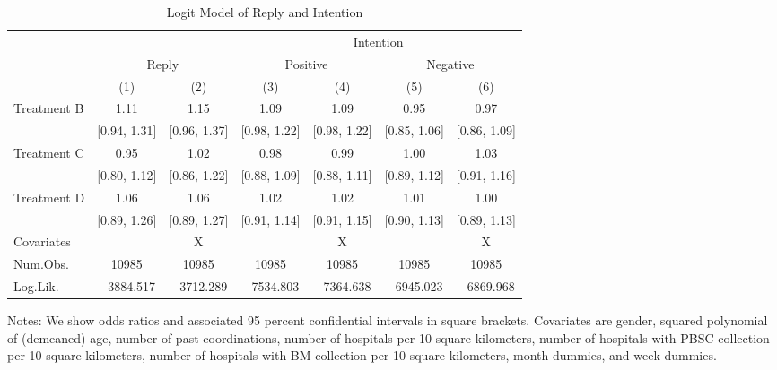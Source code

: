 \documentclass[
]{article}
\begin{document}
\begin{table}[H]

\caption{\label{tab:logit-stock}Logit Model of Reply and Intention}
\centering
\fontsize{9}{11}\selectfont
\begin{threeparttable}
\begin{tabular}[t]{lcccccc}
\toprule
\multicolumn{3}{c}{ } & \multicolumn{4}{c}{Intention} \\
\cmidrule(l{3pt}r{3pt}){4-7}
\multicolumn{1}{c}{ } & \multicolumn{2}{c}{Reply} & \multicolumn{2}{c}{Positive} & \multicolumn{2}{c}{Negative} \\
\cmidrule(l{3pt}r{3pt}){2-3} \cmidrule(l{3pt}r{3pt}){4-5} \cmidrule(l{3pt}r{3pt}){6-7}
  & (1) & (2) & (3) & (4) & (5) & (6)\\
\midrule
Treatment B & \num{1.11} & \num{1.15} & \num{1.09} & \num{1.09} & \num{0.95} & \num{0.97}\\
 & {}[\num{0.94}, \num{1.31}] & {}[\num{0.96}, \num{1.37}] & {}[\num{0.98}, \num{1.22}] & {}[\num{0.98}, \num{1.22}] & {}[\num{0.85}, \num{1.06}] & {}[\num{0.86}, \num{1.09}]\\
Treatment C & \num{0.95} & \num{1.02} & \num{0.98} & \num{0.99} & \num{1.00} & \num{1.03}\\
 & {}[\num{0.80}, \num{1.12}] & {}[\num{0.86}, \num{1.22}] & {}[\num{0.88}, \num{1.09}] & {}[\num{0.88}, \num{1.11}] & {}[\num{0.89}, \num{1.12}] & {}[\num{0.91}, \num{1.16}]\\
Treatment D & \num{1.06} & \num{1.06} & \num{1.02} & \num{1.02} & \num{1.01} & \num{1.00}\\
 & {}[\num{0.89}, \num{1.26}] & {}[\num{0.89}, \num{1.27}] & {}[\num{0.91}, \num{1.14}] & {}[\num{0.91}, \num{1.15}] & {}[\num{0.90}, \num{1.13}] & {}[\num{0.89}, \num{1.13}]\\
\midrule
Covariates &  & X &  & X &  & X\\
Num.Obs. & \num{10985} & \num{10985} & \num{10985} & \num{10985} & \num{10985} & \num{10985}\\
Log.Lik. & \num{-3884.517} & \num{-3712.289} & \num{-7534.803} & \num{-7364.638} & \num{-6945.023} & \num{-6869.968}\\
\bottomrule
\end{tabular}
\begin{tablenotes}
\item Notes: We show odds ratios and associated 95 percent confidential intervals in square brackets. Covariates are gender, squared polynomial of (demeaned) age, number of past coordinations, number of hospitals per 10 square kilometers, number of hospitals with PBSC collection per 10 square kilometers, number of hospitals with BM collection per 10 square kilometers, month dummies, and week dummies.
\end{tablenotes}
\end{threeparttable}
\end{table}
\end{document}

